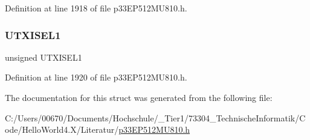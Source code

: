 Definition at line 1918 of file p33\+E\+P512\+M\+U810.\+h.

\mbox{\label{structtag_u3_s_t_a_b_i_t_s_af7ce0d24148cffc8fc3d8abccf37ea9f}} 
\subsubsection{\texorpdfstring{U\+T\+X\+I\+S\+E\+L1}{UTXISEL1}}
{\footnotesize\ttfamily unsigned U\+T\+X\+I\+S\+E\+L1}



Definition at line 1920 of file p33\+E\+P512\+M\+U810.\+h.



The documentation for this struct was generated from the following file\+:\begin{DoxyCompactItemize}
\item 
C\+:/\+Users/00670/\+Documents/\+Hochschule/\+\_\+\+Tier1/73304\+\_\+\+Technische\+Informatik/\+Code/\+Hello\+World4.\+X/\+Literatur/\hyperlink{p33_e_p512_m_u810_8h}{p33\+E\+P512\+M\+U810.\+h}\end{DoxyCompactItemize}
